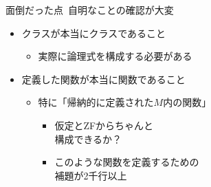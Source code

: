 \documentclass[17pt]{beamer}
\begin{document}
\begin{frame}{面倒だった点\, {\normalsize 自明なことの確認が大変}}
    
    {\small\begin{itemize}[left=0cm,itemsep=8pt]
        \item クラスが本当にクラスであること
        \begin{itemize}
            \item 実際に論理式を構成する必要がある
        \end{itemize}
        \item 定義した関数が本当に関数であること
        \vspace{5pt}
        \begin{itemize}
            \item 特に「帰納的に定義された$M$内の関数」
            \vspace{5pt}
            {\begin{itemize}[itemsep=5pt]
                \item 仮定とZFからちゃんと\\
                構成できるか？
                \item このような関数を定義するための\\
                補題が2千行以上
            \end{itemize}}
        \end{itemize}
    \end{itemize}}
\end{frame}
\end{document}
